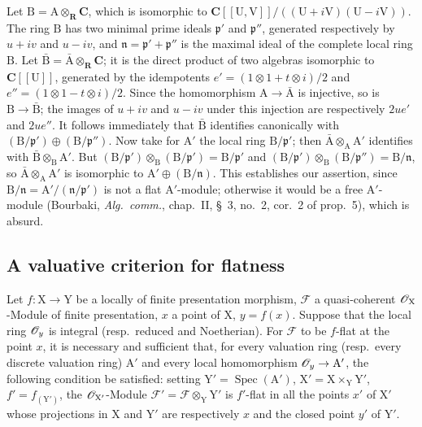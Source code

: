 \begin{env}[11.7.5]
Let $\mathrm{B}=\mathrm{A}\otimes_\mathbf{R}\mathbf{C}$, which is isomorphic to $\mathbf{C}[[\mathrm{U},\mathrm{V}]]/((\mathrm{U}+i\mathrm{V})(\mathrm{U}-i\mathrm{V}))$.
The ring $\mathrm{B}$ has two minimal prime ideals $\mathfrak{p}'$ and $\mathfrak{p}''$, generated respectively by $u+iv$ and $u-iv$, and $\mathfrak{n}=\mathfrak{p}'+\mathfrak{p}''$ is the maximal ideal of the complete local ring $\mathrm{B}$.
Let $\bar{\mathrm{B}}=\bar{\mathrm{A}}\otimes_\mathbf{R}\mathbf{C}$; it is the direct product of two algebras isomorphic to $\mathbf{C}[[\mathrm{U}]]$, generated by the idempotents $e'=(1\otimes 1+t\otimes i)/2$ and $e''=(1\otimes 1-t\otimes i)/2$.
Since the homomorphism $\mathrm{A}\to\bar{\mathrm{A}}$ is injective, so is $\mathrm{B}\to\bar{\mathrm{B}}$; the images of $u+iv$ and $u-iv$ under this injection are respectively $2ue'$ and $2ue''$.
It follows immediately that $\bar{\mathrm{B}}$ identifies canonically with $(\mathrm{B}/\mathfrak{p}')\oplus(\mathrm{B}/\mathfrak{p}'')$.
Now take for $\mathrm{A}'$ the local ring $\mathrm{B}/\mathfrak{p}'$; then $\bar{\mathrm{A}}\otimes_\mathrm{A}\mathrm{A}'$ identifies with $\bar{\mathrm{B}}\otimes_\mathrm{B}\mathrm{A}'$.
But $(\mathrm{B}/\mathfrak{p}')\otimes_\mathrm{B}(\mathrm{B}/\mathfrak{p}')=\mathrm{B}/\mathfrak{p}'$ and $(\mathrm{B}/\mathfrak{p}')\otimes_\mathrm{B}(\mathrm{B}/\mathfrak{p}'')=\mathrm{B}/\mathfrak{n}$, so $\bar{\mathrm{A}}\otimes_\mathrm{A}\mathrm{A}'$ is isomorphic to $\mathrm{A}'\oplus(\mathrm{B}/\mathfrak{n})$.
This establishes our assertion, since $\mathrm{B}/\mathfrak{n}=\mathrm{A}'/(\mathfrak{n}/\mathfrak{p}')$ is not a flat $\mathrm{A}'$-module; otherwise it would be a free $\mathrm{A}'$-module (Bourbaki, \emph{Alg.\ comm.}, chap.~II, \S~3, no.~2, cor.~2 of prop.~5), which is absurd.
\end{env}

\subsection{A valuative criterion for flatness}
\label{subsection:IV.11.8}

\begin{theorem}[11.8.1]
\label{IV.11.8.1}
Let $f:\mathrm{X}\to\mathrm{Y}$ be a locally of finite presentation morphism, $\mathscr{F}$ a quasi-coherent $\mathscr{O}_\mathrm{X}$-Module of finite presentation, $x$ a point of $\mathrm{X}$, $y=f(x)$.
Suppose that the local ring $\mathscr{O}_y$ is integral (resp.\ reduced and Noetherian).
For $\mathscr{F}$ to be $f$-flat at the point $x$, it is necessary and sufficient that, for every valuation ring (resp.\ every discrete valuation ring) $\mathrm{A}'$ and every local homomorphism $\mathscr{O}_y\to\mathrm{A}'$, the following condition be satisfied: setting $\mathrm{Y}'=\operatorname{Spec}(\mathrm{A}')$, $\mathrm{X}'=\mathrm{X}\times_\mathrm{Y}\mathrm{Y}'$, $f'=f_{(\mathrm{Y}')}$, the $\mathscr{O}_{\mathrm{X}'}$-Module $\mathscr{F}'=\mathscr{F}\otimes_\mathrm{Y}\mathrm{Y}'$ is $f'$-flat in all the points $x'$ of $\mathrm{X}'$ whose projections in $\mathrm{X}$ and $\mathrm{Y}'$ are respectively $x$ and the closed point $y'$ of $\mathrm{Y}'$.
\end{theorem}

